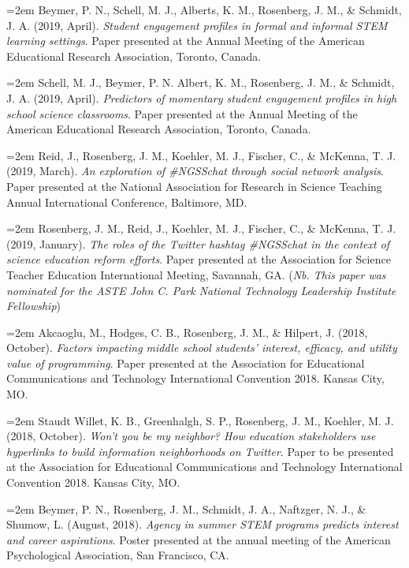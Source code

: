 \documentclass[
  11pt,
]{article}
\begin{document}
\hangindent=2em Beymer, P. N., Schell, M. J., Alberts, K. M., Rosenberg,
J. M., \& Schmidt, J. A. (2019, April). \emph{Student engagement
profiles in formal and informal STEM learning settings}. Paper presented
at the Annual Meeting of the American Educational Research Association,
Toronto, Canada.

\hangindent=2em Schell, M. J., Beymer, P. N. Albert, K. M., Rosenberg,
J. M., \& Schmidt, J. A. (2019, April). \emph{Predictors of momentary
student engagement profiles in high school science classrooms}. Paper
presented at the Annual Meeting of the American Educational Research
Association, Toronto, Canada.

\hangindent=2em Reid, J., Rosenberg, J. M., Koehler, M. J., Fischer, C.,
\& McKenna, T. J. (2019, March). \emph{An exploration of \#NGSSchat
through social network analysis}. Paper presented at the National
Association for Research in Science Teaching Annual International
Conference, Baltimore, MD.

\hangindent=2em Rosenberg, J. M., Reid, J., Koehler, M. J., Fischer, C.,
\& McKenna, T. J. (2019, January). \emph{The roles of the Twitter
hashtag \#NGSSchat in the context of science education reform efforts}.
Paper presented at the Association for Science Teacher Education
International Meeting, Savannah, GA. (\emph{Nb. This paper was nominated
for the ASTE John C. Park National Technology Leadership Institute
Fellowship})

\hangindent=2em Akcaoglu, M., Hodges, C. B., Rosenberg, J. M., \&
Hilpert, J. (2018, October). \emph{Factors impacting middle school
students' interest, efficacy, and utility value of programming}. Paper
presented at the Association for Educational Communications and
Technology International Convention 2018. Kansas City, MO.

\hangindent=2em Staudt Willet, K. B., Greenhalgh, S. P., Rosenberg, J.
M., Koehler, M. J. (2018, October). \emph{Won't you be my neighbor? How
education stakeholders use hyperlinks to build information neighborhoods
on Twitter}. Paper to be presented at the Association for Educational
Communications and Technology International Convention 2018. Kansas
City, MO.

\hangindent=2em Beymer, P. N., Rosenberg, J. M., Schmidt, J. A.,
Naftzger, N. J., \& Shumow, L. (August, 2018). \emph{Agency in summer
STEM programs predicts interest and career aspirations}. Poster
presented at the annual meeting of the American Psychological
Association, San Francisco, CA.
\end{document}
